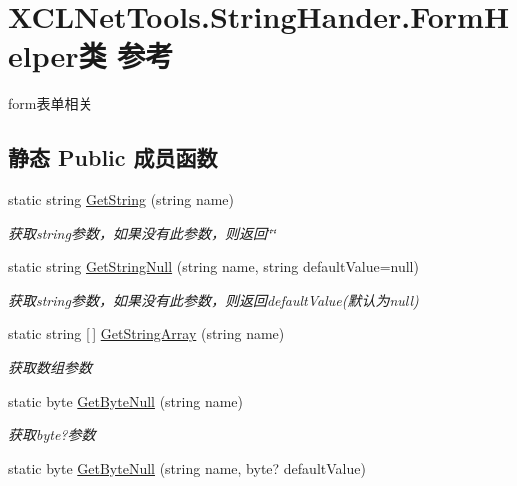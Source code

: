 \hypertarget{class_x_c_l_net_tools_1_1_string_hander_1_1_form_helper}{}\section{X\+C\+L\+Net\+Tools.\+String\+Hander.\+Form\+Helper类 参考}
\label{class_x_c_l_net_tools_1_1_string_hander_1_1_form_helper}


form表单相关  


\subsection*{静态 Public 成员函数}
\begin{DoxyCompactItemize}
\item 
static string \hyperlink{class_x_c_l_net_tools_1_1_string_hander_1_1_form_helper_a8c34c5210ad29ea122ee8320b4f14f9f}{Get\+String} (string name)
\begin{DoxyCompactList}\small\item\em 获取string参数，如果没有此参数，则返回\char`\"{}\char`\"{} \end{DoxyCompactList}\item 
static string \hyperlink{class_x_c_l_net_tools_1_1_string_hander_1_1_form_helper_a953f8f717a6b0b26541f0a06c99fe19c}{Get\+String\+Null} (string name, string default\+Value=null)
\begin{DoxyCompactList}\small\item\em 获取string参数，如果没有此参数，则返回default\+Value(默认为null) \end{DoxyCompactList}\item 
static string \mbox{[}$\,$\mbox{]} \hyperlink{class_x_c_l_net_tools_1_1_string_hander_1_1_form_helper_a9b7680e6e7975889a62f273eaacdf37c}{Get\+String\+Array} (string name)
\begin{DoxyCompactList}\small\item\em 获取数组参数 \end{DoxyCompactList}\item 
static byte \hyperlink{class_x_c_l_net_tools_1_1_string_hander_1_1_form_helper_a9d43824d313342bfc66623f548ad6ad6}{Get\+Byte\+Null} (string name)
\begin{DoxyCompactList}\small\item\em 获取byte?参数 \end{DoxyCompactList}\item 
static byte \hyperlink{class_x_c_l_net_tools_1_1_string_hander_1_1_form_helper_a521282b2f24ebfb3f33c6376b3553021}{Get\+Byte\+Null} (string name, byte? default\+Value)

\end{DoxyCompactItemize}
